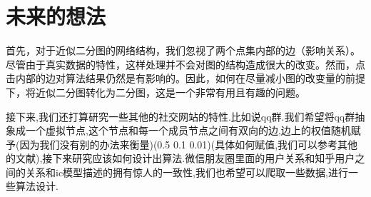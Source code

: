 \documentclass[11pt, a4paper]{article}
\begin{document}
  \section{未来的想法}

  首先，对于近似二分图的网络结构，我们忽视了两个点集内部的边（影响关系）。尽管由于真实数据的特性，这样处理并不会对图的结构造成很大的改变。然而，点击内部的边对算法结果仍然是有影响的。因此，如何在尽量减小图的改变量的前提下，将近似二分图转化为二分图，这是一个非常有用且有趣的问题。

  接下来,我们还打算研究一些其他的社交网站的特性.比如说qq群.我们希望将qq群抽象成一个虚拟节点,这个节点和每一个成员节点之间有双向的边,边上的权值随机赋予(因为我们没有别的办法来衡量)(0.5 0.1 0.01)(具体如何赋值,我们可以参考其他的文献),接下来研究应该如何设计出算法.微信朋友圈里面的用户关系和知乎用户之间的关系和ic模型描述的拥有惊人的一致性,我们也希望可以爬取一些数据,进行一些算法设计.

{}

\end{document}
